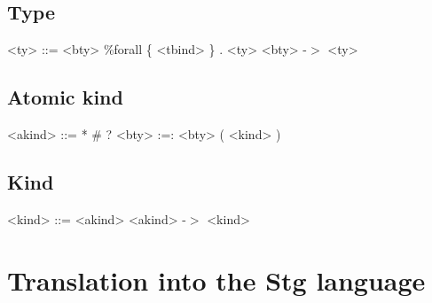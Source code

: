 \subsection*{Type}

\begin{grammar}
<ty> ::= <bty>
    \alt \%forall \{ <tbind> \} . <ty>
    \alt <bty> -$>$ <ty>
\end{grammar}

\subsection*{Atomic kind}

\begin{grammar}
<akind> ::= *
       \alt \#
       \alt ?
       \alt <bty> :=: <bty>
       \alt ( <kind> )
\end{grammar}

\subsection*{Kind}

\begin{grammar}
<kind> ::= <akind>
      \alt <akind> -$>$ <kind>
\end{grammar}

\section*{Translation into the Stg language}

